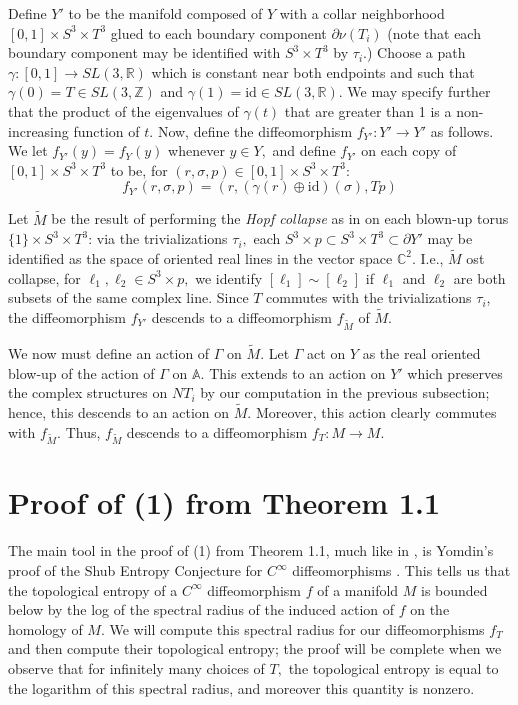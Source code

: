 \documentclass{amsart}
\theoremstyle{theorem}
\theoremstyle{definition}
\theoremstyle{definition}
\theoremstyle{definition}
\theoremstyle{theorem}
\theoremstyle{theorem}
\theoremstyle{theorem}
\theoremstyle{corollary}
\theoremstyle{question}
\theoremstyle{remark}
\begin{document}
Define $Y'$ to be the manifold composed of $Y$ with a collar neighborhood $[0,1]\times S^3\times T^3$ glued to each boundary component $\partial\nu(T_i)$ (note that each boundary component may be identified with $S^3\times T^3$ by $\tau_i$.) Choose a path $\gamma:[0,1]\to SL(3, \mathbb{R})$ which is constant near both endpoints and such that $\gamma(0) = T\in SL(3, \mathbb{Z})$ and $\gamma(1)=\text{id}\in SL(3, \mathbb{R}).$ We may specify further that the product of the eigenvalues of $\gamma(t)$ that are greater than 1 is a non-increasing function of $t.$ Now, define the diffeomorphism $f_{Y'}:Y'\to Y'$ as follows. We let $f_{Y'}(y)=f_Y(y)$ whenever $y\in Y,$ and define $f_{Y'}$ on each copy of $[0,1]\times S^3\times T^3$ to be, for $(r, \sigma, p)\in[0,1]\times S^3\times T^3$: $$f_{Y'}(r, \sigma, p)=(r, \left(\gamma(r)\oplus\text{id}\right)(\sigma), Tp)$$

Let $\tilde{M}$ be the result of performing the \emph{Hopf collapse} as in \cite[pp. 7-8]{FL} on each blown-up torus $\{1\}\times S^3\times T^3$: via the trivializations $\tau_i,$ each $S^3\times p\subset S^3\times T^3\subset\partial Y'$ may be identified as the space of oriented real lines in the vector space $\mathbb{C}^2.$ I.e., $\tilde{M}$ ost collapse, for $\ell_1,\ell_2\in S^3\times p,$ we identify $[\ell_1]\sim[\ell_2]$ if $\ell_1$ and $\ell_2$ are both subsets of the same complex line. Since $T$ commutes with the trivializations $\tau_i$, the diffeomorphism $f_{Y'}$ descends to a diffeomorphism $f_{\tilde{M}}$ of $\tilde{M}$. 

We now must define an action of $\Gamma$ on $\tilde{M}$. Let $\Gamma$ act on $Y$ as the real oriented blow-up of the action of $\Gamma$ on $\mathbb{A}.$ This extends to an action on $Y'$ which preserves the complex structures on $NT_i$ by our computation in the previous subsection; hence, this descends to an action on $\tilde{M}.$ Moreover, this action clearly commutes with $f_{\tilde{M}}.$ Thus, $f_{\tilde{M}}$ descends to a diffeomorphism $f_T:M\to M.$ 

\section{Proof of (1) from Theorem 1.1}

The main tool in the proof of (1) from Theorem 1.1, much like in \cite{FL}, is Yomdin's proof of the Shub Entropy Conjecture for $C^\infty$ diffeomorphisms \cite{Yomdin}. This tells us that the topological entropy of a $C^\infty$ diffeomorphism $f$ of a manifold $M$ is bounded below by the log of the spectral radius of the induced action of $f$ on the homology of $M.$ We will compute this spectral radius for our diffeomorphisms $f_T$ and then compute their topological entropy; the proof will be complete when we observe that for infinitely many choices of $T,$ the topological entropy is equal to the logarithm of this spectral radius, and moreover this quantity is nonzero.
\end{document}
